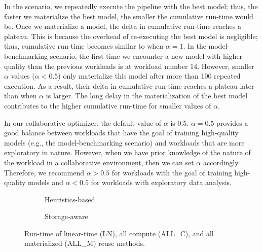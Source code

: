 In the scenario, we repeatedly execute the pipeline with the best model; thus, the faster we materialize the best model, the smaller the cumulative run-time would be.
Once we materialize a model, the delta in cumulative run-time reaches a plateau.
This is because the overhead of re-executing the best model is negligible; thus, cumulative run-time becomes similar to when $\alpha=1$.
In the model-benchmarking scenario, the first time we encounter a new model with higher quality than the previous workloads is at workload number 14.
However, smaller $\alpha$ values ($\alpha<0.5$) only materialize this model after more than 100 repeated execution.
As a result, their delta in cumulative run-time reaches a plateau later than when $\alpha$ is larger.
The long delay in the materialization of the best model contributes to the higher cumulative run-time for smaller values of $\alpha$.

In our collaborative optimizer, the default value of $\alpha$ is 0.5. 
$\alpha =0.5$ provides a good balance between workloads that have the goal of training high-quality models (e.g., the model-benchmarking scenario) and workloads that are more exploratory in nature.
However, when we have prior knowledge of the nature of the workload in a collaborative environment, then we can set $\alpha$ accordingly.
Therefore, we recommend $\alpha>0.5$ for workloads with the goal of training high-quality models and $\alpha<0.5$ for workloads with exploratory data analysis.
\begin{figure}[h]
\begin{subfigure}[b]{0.5\linewidth}
\centering
 \resizebox{\columnwidth}{!}{%
%
}
\caption{Heuristics-based}
\end{subfigure}%
\begin{subfigure}[b]{0.5\linewidth}
\centering
 \resizebox{\columnwidth}{!}{%
%
}
\caption{Storage-aware}
\end{subfigure}
\caption{Run-time of linear-time (LN), all compute (ALL\_C), and all materialized (ALL\_M) reuse methods.}
\label{reuse-experiment}
\vspace{-4mm}
\end{figure}
